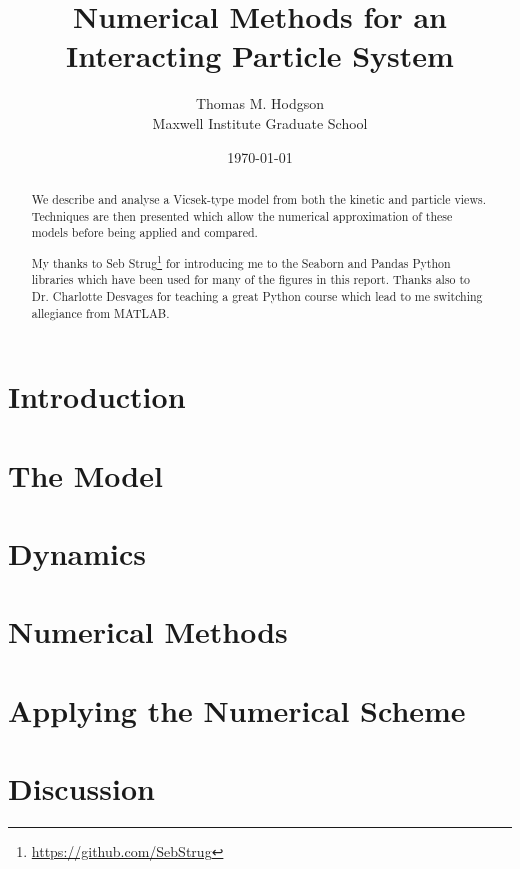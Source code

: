\documentclass[11pt, a4paper, final]{article}
\title{{\huge Numerical Methods for an Interacting Particle System}}
\author{Thomas M. Hodgson\\ \vspace{0.5cm} Maxwell Institute Graduate School}
\date{\today}
\newcommand\testname{Acknowledgements}
\newenvironment{acknowledge}
{\renewcommand\abstractname{\testname}\begin{abstract}}
    {\end{abstract}}
\begin{document}
	\maketitle
    \thispagestyle{empty}
	\newpage
	\tableofcontents
	\listoffigures
	\newpage
    \begin{abstract}
        We describe and analyse a Vicsek-type model from both the kinetic and particle views. Techniques are then presented which allow the numerical approximation of these models before being applied and compared.
    \end{abstract}
    \begin{acknowledge}
        My thanks to Seb Strug\footnote{\url{https://github.com/SebStrug}} for introducing me to the Seaborn and Pandas Python libraries which have been used for many of the figures in this report. Thanks also to Dr. Charlotte Desvages for teaching a great Python course which lead to me switching allegiance from MATLAB.
    \end{acknowledge}
      \newpage 
	\section{Introduction}\label{sec:introduction}
        
       
	\section{The Model}\label{sec:model}
              
	\section{Dynamics}\label{sec:dynamics}
        
        
   	\section{Numerical Methods}\label{sec:numericalmethods}
        
 
    \section{Applying the Numerical Scheme}\label{sec:application}
        
        
    \section{Discussion}\label{sec:discussion}
        
\end{document}
